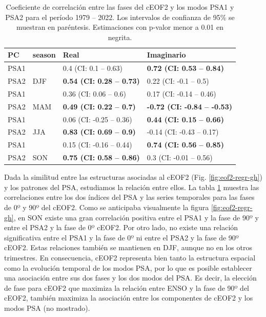 \documentclass[12pt,oneside]{reedthesis}
\begin{document}
\begin{table}

\caption{\label{tab:psa-eof2}Coeficiente de correlación entre las fases del cEOF2 y los modos PSA1 y PSA2 para el período 1979 -- 2022.
Los intervalos de confianza de 95\% se muestran en paréntesis.
Estimaciones con p-valor menor a 0.01 en negrita.}
\centering
\begin{tabular}[t]{ll>{}l>{}l}
\toprule
PC & season & Real & Imaginario\\
\midrule
PSA1 &  & 0.4 (CI: 0.1 -- 0.63) & \textbf{0.72 (CI: 0.53 -- 0.84)}\\
\cmidrule{1-1}
\cmidrule{3-4}
PSA2 & \multirow[t]{-2}{*}{\raggedright\arraybackslash DJF} & \textbf{0.54 (CI: 0.28 -- 0.73)} & 0.22 (CI: -0.1 -- 0.5)\\
\cmidrule{1-4}
PSA1 &  & 0.36 (CI: 0.06 -- 0.6) & 0.17 (CI: -0.14 -- 0.46)\\
\cmidrule{1-1}
\cmidrule{3-4}
PSA2 & \multirow[t]{-2}{*}{\raggedright\arraybackslash MAM} & \textbf{0.49 (CI: 0.22 -- 0.7)} & \textbf{-0.72 (CI: -0.84 -- -0.53)}\\
\cmidrule{1-4}
PSA1 &  & 0.06 (CI: -0.25 -- 0.36) & \textbf{0.44 (CI: 0.15 -- 0.66)}\\
\cmidrule{1-1}
\cmidrule{3-4}
PSA2 & \multirow[t]{-2}{*}{\raggedright\arraybackslash JJA} & \textbf{0.83 (CI: 0.69 -- 0.9)} & -0.14 (CI: -0.43 -- 0.17)\\
\cmidrule{1-4}
PSA1 &  & 0.15 (CI: -0.16 -- 0.44) & \textbf{0.74 (CI: 0.56 -- 0.85)}\\
\cmidrule{1-1}
\cmidrule{3-4}
PSA2 & \multirow[t]{-2}{*}{\raggedright\arraybackslash SON} & \textbf{0.75 (CI: 0.58 -- 0.86)} & 0.3 (CI: -0.01 -- 0.56)\\
\bottomrule
\end{tabular}
\end{table}

Dada la similitud entre las estructuras asociadas al cEOF2 (Fig. \ref{fig:eof2-regr-gh}) y los patrones del PSA, estudiamos la relación entre ellos.
La tabla \ref{tab:psa-eof2} muestra las correlaciones entre los dos índices del PSA y las series temporales para las fases de 0º y 90º del cEOF2.
Como se anticipaba visualmente la figura \ref{fig:eof2-regr-gh}, en SON existe una gran correlación positiva entre el PSA1 y la fase de 90º y entre el PSA2 y la fase de 0º cEOF2.
Por otro lado, no existe una relación significativa entre el PSA1 y la fase de 0º ni entre el PSA2 y la fase de 90º cEOF2.
Estas relaciones también se mantienen en DJF, aunque no en los otros trimestres.
En consecuencia, cEOF2 representa bien tanto la estructura espacial como la evolución temporal de los modos PSA, por lo que es posible establecer una asociación entre sus dos fases y los dos modos del PSA.
Es decir, la elección de fase para cEOF2 que maximiza la relación entre ENSO y la fase de 90º del cEOF2, también maximiza la asociación entre los componentes de cEOF2 y los modos PSA (no mostrado).
\end{document}
